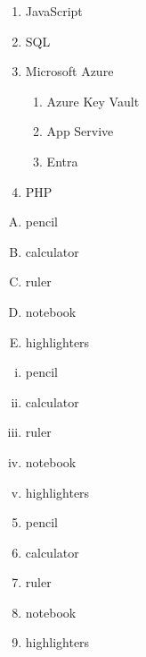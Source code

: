 \documentclass[11pt]{article}
\begin{document}
\begin{enumerate}
  \item JavaScript
  \item SQL
  \item Microsoft Azure
    \begin{enumerate}
      \item Azure Key Vault
      \item App Servive
      \item Entra
    \end{enumerate}
  \item PHP
\end{enumerate}

\vspace{1cm}

\begin{enumerate}[A.]
  \item pencil
  \item calculator
  \item ruler
  \item notebook
  \item highlighters
\end{enumerate}

\vspace{1cm}

\begin{enumerate}[i.]
  \item pencil
  \item calculator
  \item ruler
  \item notebook
  \item highlighters
\end{enumerate}

\vspace{1cm}

\begin{enumerate} \setcounter{enumi}{4}
  \item pencil
  \item calculator
  \item ruler
  \item notebook
  \item highlighters
\end{enumerate}

\pagebreak
\end{document}
